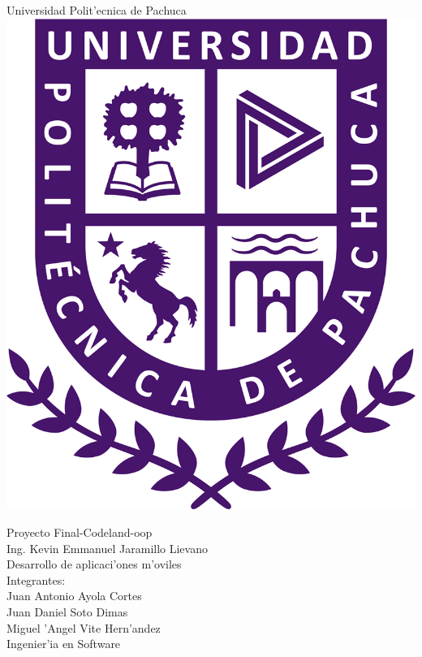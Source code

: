 \begin{titlepage}
	\begin{center}
		\sc \LARGE Universidad Polit'ecnica de Pachuca\\
		\bigskip
		\includegraphics[scale=0.2]{img/logo.png}
	\end{center}
	\bigskip
	\begin{center}
		\huge{Proyecto Final-Codeland-oop\\}
		\vspace*{1cm}
		\sc \LARGE Ing. Kevin Emmanuel Jaramillo Lievano\\
		\vspace*{0.5cm}
		\sc \LARGE Desarrollo de aplicaci'ones m'oviles\\
		\vspace*{0.5cm}
		\sc \LARGE Integrantes: \\
	    \sc \Large Juan Antonio Ayola Cortes \\
	    \sc \Large Juan Daniel Soto Dimas \\
		\sc \Large Miguel 'Angel Vite Hern'andez \\
		\vfill
		\sc Ingenier'ia en Software
	\end{center}
\end{titlepage}